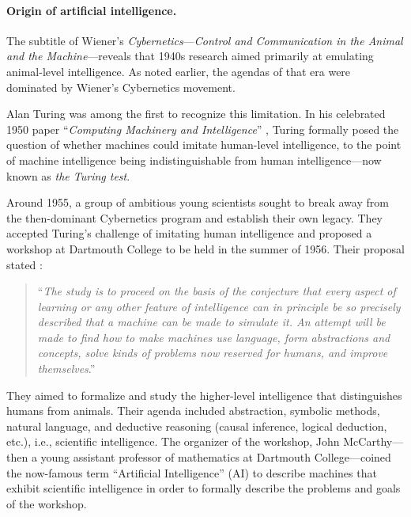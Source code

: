 \documentclass[../../book-main.tex]{subfiles}
\begin{document}
\paragraph{Origin of artificial intelligence.}
The subtitle of Wiener's \textit{Cybernetics}---\textit{Control and Communication in the Animal and the Machine}---reveals that 1940s research aimed primarily at emulating animal-level intelligence. As noted earlier, the agendas of that era were dominated by Wiener's Cybernetics movement.

Alan Turing was among the first to recognize this limitation. In his celebrated 1950 paper ``\textit{Computing Machinery and Intelligence}'' \cite{Turing-1950}, Turing formally posed the question of whether machines could imitate human-level intelligence, to the point of machine intelligence being indistinguishable from human intelligence---now known as \textit{the Turing test}.

Around 1955, a group of ambitious young scientists sought to break away from the then-dominant Cybernetics program and establish their own legacy. They accepted Turing's challenge of imitating human intelligence and proposed a workshop at Dartmouth College to be held in the summer of 1956. Their proposal stated \cite{McCarthy-1955}:
\begin{quote}
    ``\textit{The study is to proceed on the basis of the conjecture that every aspect of learning or any other feature of intelligence can in principle be so precisely described that a machine can be made to simulate it. An attempt will be made to find how to make machines use language, form abstractions and concepts, solve kinds of problems now reserved for humans, and improve themselves}.''
\end{quote}
They aimed to formalize and study the higher-level intelligence that distinguishes humans from animals. Their agenda included abstraction, symbolic methods, natural language, and deductive reasoning (causal inference, logical deduction, etc.), i.e., scientific intelligence. The organizer of the workshop, John McCarthy---then a young assistant professor of mathematics at Dartmouth College---coined the now-famous term ``Artificial Intelligence'' (AI) to describe machines that exhibit scientific intelligence in order to formally describe the problems and goals of the workshop.
\end{document}
